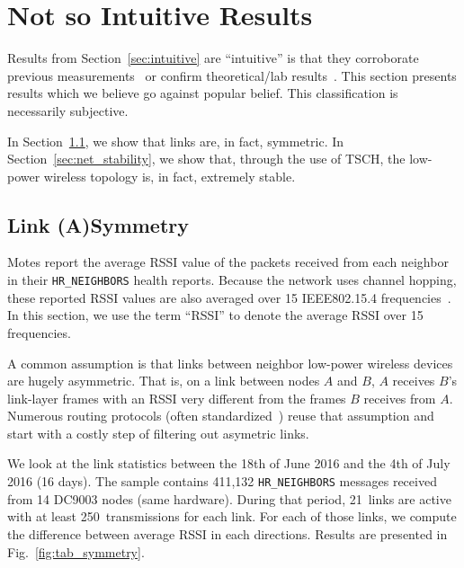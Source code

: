\documentclass{sig-alternate}
\newcommand{\HRNEIGHBORS}         {{\tt HR\_NEIGHBORS}\xspace}
\begin{document}
\section{Not so Intuitive Results}
\label{sec:notsointuitive}

Results from Section~\ref{sec:intuitive} are ``intuitive'' is that they corroborate previous measurements~\cite{watteyne16peach} or confirm theoretical/lab results~\cite{watteyne10mitigating,watteyne09reliability,watteyne15industrial}.
This section presents results which we believe go against popular belief.
This classification is necessarily subjective.

In Section~\ref{sec:symmetry}, we show that links are, in fact, symmetric.
In Section~\ref{sec:net_stability}, we show that, through the use of TSCH, the low-power wireless topology is, in fact, extremely stable.

\subsection{Link (A)Symmetry}
\label{sec:symmetry}


Motes report the average RSSI value of the packets received from each neighbor in their \HRNEIGHBORS health reports.
Because the network uses channel hopping, these reported RSSI values are also averaged over 15 IEEE802.15.4 frequencies~\cite{std_ieee802154_2011}.
In this section, we use the term ``RSSI'' to denote the average RSSI over 15 frequencies.


A common assumption is that links between neighbor low-power wireless devices are hugely asymmetric.
That is, on a link between nodes $A$ and $B$, $A$ receives $B$'s link-layer frames with an RSSI very different from the frames $B$ receives from $A$.
Numerous routing protocols (often standardized~\cite{rfc3626}) reuse that assumption and start with a costly step of filtering out asymetric links.


We look at the link statistics between the 18th of June 2016 and the 4th of July 2016 (16 days).
The sample contains 411,132 \HRNEIGHBORS messages received from 14 DC9003 nodes (same hardware).
During that period, 21~links are active with at least 250~transmissions for each link.
For each of those links, we compute the difference between average RSSI in each directions.
Results are presented in Fig.~\ref{fig:tab_symmetry}.
\end{document}
